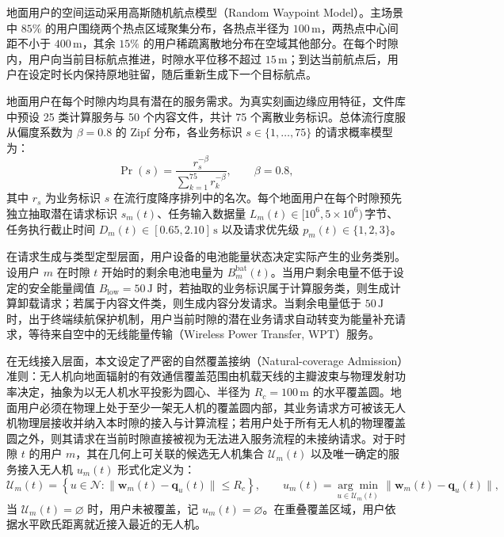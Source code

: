 地面用户的空间运动采用高斯随机航点模型（Random Waypoint Model）。主场景中 $85\%$ 的用户围绕两个热点区域聚集分布，各热点半径为 $100\,\mathrm{m}$，两热点中心间距不小于 $400\,\mathrm{m}$，其余 $15\%$ 的用户稀疏离散地分布在空域其他部分。在每个时隙内，用户向当前目标航点推进，时隙水平位移不超过 $15\,\mathrm{m}$；到达当前航点后，用户在设定时长内保持原地驻留，随后重新生成下一个目标航点。

地面用户在每个时隙内均具有潜在的服务需求。为真实刻画边缘应用特征，文件库中预设 25 类计算服务与 50 个内容文件，共计 75 个离散业务标识。总体流行度服从偏度系数为 $\beta=0.8$ 的 Zipf 分布，各业务标识 $s \in \{1, \dots, 75\}$ 的请求概率模型为：
\begin{equation}
    \Pr(s) = \frac{r_s^{-\beta}}{\sum_{k=1}^{75} r_k^{-\beta}}, \qquad \beta=0.8,
    \label{eq:ch3-zipf}
\end{equation}
其中 $r_s$ 为业务标识 $s$ 在流行度降序排列中的名次。每个地面用户在每个时隙预先独立抽取潜在请求标识 $s_m(t)$、任务输入数据量 $L_m(t)\in [10^6, 5\times 10^6)\,\text{字节}$、任务执行截止时间 $D_m(t)\in [0.65, 2.10]\,\mathrm{s}$ 以及请求优先级 $p_m(t)\in \{1, 2, 3\}$。

在请求生成与类型定型层面，用户设备的电池能量状态决定实际产生的业务类别。设用户 $m$ 在时隙 $t$ 开始时的剩余电池电量为 $B_m^{\mathrm{bat}}(t)$。当用户剩余电量不低于设定的安全能量阈值 $B_{\mathrm{low}}=50\,\mathrm{J}$ 时，若抽取的业务标识属于计算服务类，则生成计算卸载请求；若属于内容文件类，则生成内容分发请求。当剩余电量低于 $50\,\mathrm{J}$ 时，出于终端续航保护机制，用户当前时隙的潜在业务请求自动转变为能量补充请求，等待来自空中的无线能量传输（Wireless Power Transfer, WPT）服务。

在无线接入层面，本文设定了严密的自然覆盖接纳（Natural-coverage Admission）准则：无人机向地面辐射的有效通信覆盖范围由机载天线的主瓣波束与物理发射功率决定，抽象为以无人机水平投影为圆心、半径为 $R_c=100\,\mathrm{m}$ 的水平覆盖圆。地面用户必须在物理上处于至少一架无人机的覆盖圆内部，其业务请求方可被该无人机物理层接收并纳入本时隙的接入与计算流程；若用户处于所有无人机的物理覆盖圆之外，则其请求在当前时隙直接被视为无法进入服务流程的未接纳请求。对于时隙 $t$ 的用户 $m$，其在几何上可关联的候选无人机集合 $\mathcal U_m(t)$ 以及唯一确定的服务接入无人机 $u_m(t)$ 形式化定义为：
\begin{equation}
    \mathcal U_m(t) = \left\{u\in\mathcal N : \|\mathbf w_m(t) - \mathbf q_u(t)\| \leq R_c\right\},
    \qquad
    u_m(t) = \underset{u\in\mathcal U_m(t)}{\arg\min}\, \|\mathbf w_m(t) - \mathbf q_u(t)\|,
    \label{eq:ch3-natural-association}
\end{equation}
当 $\mathcal U_m(t) = \varnothing$ 时，用户未被覆盖，记 $u_m(t) = \varnothing$。在重叠覆盖区域，用户依据水平欧氏距离就近接入最近的无人机。

